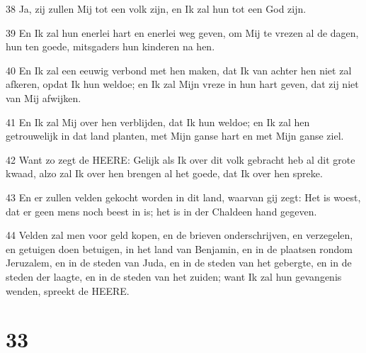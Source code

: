 \par 38 Ja, zij zullen Mij tot een volk zijn, en Ik zal hun tot een God zijn.
\par 39 En Ik zal hun enerlei hart en enerlei weg geven, om Mij te vrezen al de dagen, hun ten goede, mitsgaders hun kinderen na hen.
\par 40 En Ik zal een eeuwig verbond met hen maken, dat Ik van achter hen niet zal afkeren, opdat Ik hun weldoe; en Ik zal Mijn vreze in hun hart geven, dat zij niet van Mij afwijken.
\par 41 En Ik zal Mij over hen verblijden, dat Ik hun weldoe; en Ik zal hen getrouwelijk in dat land planten, met Mijn ganse hart en met Mijn ganse ziel.
\par 42 Want zo zegt de HEERE: Gelijk als Ik over dit volk gebracht heb al dit grote kwaad, alzo zal Ik over hen brengen al het goede, dat Ik over hen spreke.
\par 43 En er zullen velden gekocht worden in dit land, waarvan gij zegt: Het is woest, dat er geen mens noch beest in is; het is in der Chaldeen hand gegeven.
\par 44 Velden zal men voor geld kopen, en de brieven onderschrijven, en verzegelen, en getuigen doen betuigen, in het land van Benjamin, en in de plaatsen rondom Jeruzalem, en in de steden van Juda, en in de steden van het gebergte, en in de steden der laagte, en in de steden van het zuiden; want Ik zal hun gevangenis wenden, spreekt de HEERE.

\chapter{33}

